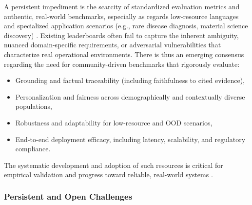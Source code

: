 A persistent impediment is the scarcity of standardized evaluation metrics and authentic, real-world benchmarks, especially as regards low-resource languages and specialized application scenarios (e.g., rare disease diagnosis, material science discovery) \cite{ref8,ref16,ref20,ref25,ref29,ref32,ref36,ref39,ref40,ref46,ref47,ref48,ref50,ref53,ref54,ref55}. Existing leaderboards often fail to capture the inherent ambiguity, nuanced domain-specific requirements, or adversarial vulnerabilities that characterize real operational environments. There is thus an emerging consensus regarding the need for community-driven benchmarks that rigorously evaluate:
\begin{itemize}
    \item Grounding and factual traceability (including faithfulness to cited evidence),
    \item Personalization and fairness across demographically and contextually diverse populations,
    \item Robustness and adaptability for low-resource and OOD scenarios,
    \item End-to-end deployment efficacy, including latency, scalability, and regulatory compliance.
\end{itemize}
The systematic development and adoption of such resources is critical for empirical validation and progress toward reliable, real-world systems \cite{ref8,ref32,ref55}.

\subsubsection{Persistent and Open Challenges}


